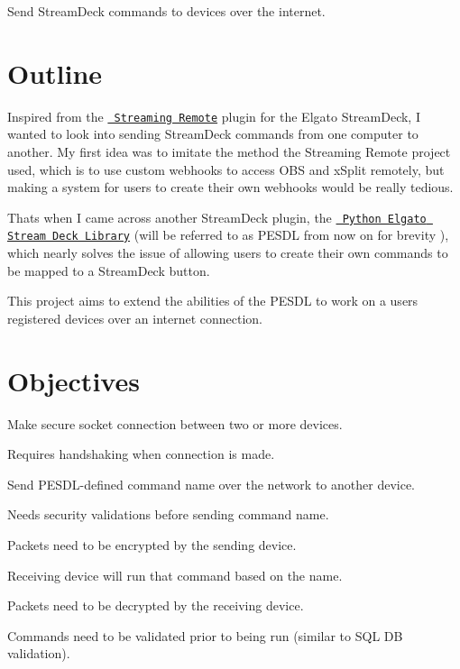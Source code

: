 Send Stream\+Deck commands to devices over the internet.

\section*{Outline}

Inspired from the \href{https://github.com/fredemmott/streaming-remote}{\texttt{ Streaming Remote}} plugin for the Elgato Stream\+Deck, I wanted to look into sending Stream\+Deck commands from one computer to another. My first idea was to imitate the method the Streaming Remote project used, which is to use custom webhooks to access O\+BS and x\+Split remotely, but making a system for users to create their own webhooks would be really tedious.

That\textquotesingle{}s when I came across another Stream\+Deck plugin, the \href{https://github.com/abcminiuser/python-elgato-streamdeck}{\texttt{ Python Elgato Stream Deck Library}} (will be referred to as P\+E\+S\+DL from now on for brevity ), which nearly solves the issue of allowing users to create their own commands to be mapped to a Stream\+Deck button.

This project aims to extend the abilities of the P\+E\+S\+DL to work on a user\textquotesingle{}s registered devices over an internet connection.

\section*{Objectives}


\begin{DoxyEnumerate}
\item Make secure socket connection between two or more devices.
\begin{DoxyItemize}
\item Requires handshaking when connection is made.
\end{DoxyItemize}
\item Send P\+E\+S\+D\+L-\/defined command name over the network to another device.
\begin{DoxyItemize}
\item Needs security validations before sending command name.
\item Packets need to be encrypted by the sending device.
\end{DoxyItemize}
\item Receiving device will run that command based on the name.
\begin{DoxyItemize}
\item Packets need to be decrypted by the receiving device.
\item Commands need to be validated prior to being run (similar to S\+QL DB validation).
\end{DoxyItemize}
\end{DoxyEnumerate}

